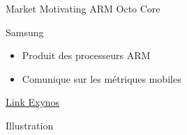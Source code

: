 %
\begin{Frame}{Market Motivating ARM Octo Core}
  \begin{block}{Samsung}
    \begin{itemize}
    \item Produit des processeurs ARM
    \item Comunique sur les métriques mobiles
    \end{itemize}
  \end{block} 
  
  \href{https://fr.wikipedia.org/wiki/Exynos}{Link Exynos}
  
  \begin{block}{Illustration}
  \end{block}   
\end{Frame}


